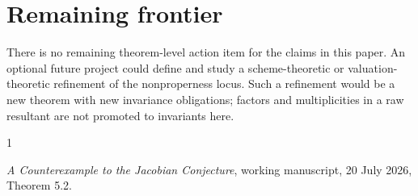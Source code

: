 \documentclass[11pt]{article}
\begin{document}
\section{Remaining frontier}

There is no remaining theorem-level action item for the claims in this paper.
An optional future project could define and study a scheme-theoretic or
valuation-theoretic refinement of the nonproperness locus.  Such a refinement
would be a new theorem with new invariance obligations; factors and
multiplicities in a raw resultant are not promoted to invariants here.

\begin{thebibliography}{1}

\emph{A Counterexample to the Jacobian Conjecture}, working manuscript,
20 July 2026, Theorem 5.2.

\end{thebibliography}
\end{document}
